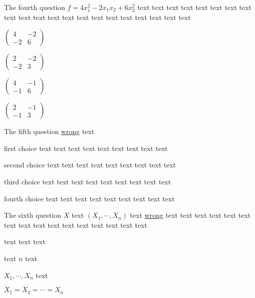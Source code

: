 \documentclass[12pt,most]{randexam}
\begin{document}
\bigskip

\begin{question}
The fourth question $f = 4 x_1^2 - 2 x_1 x_2 + 6 x_2^2$ text text text text text text
text text text text text text text text text text text text text text text 
\begin{abcd}
\item $\left(\begin{array}{cc}
  4 & - 2\\
  - 2 & 6
\end{array}\right)$
\item $\left(\begin{array}{cc}
  2 & - 2\\
  - 2 & 3
\end{array}\right)$
\item $\left(\begin{array}{cc}
  4 & - 1\\
  - 1 & 6
\end{array}\right)$
\item $\left(\begin{array}{cc}
  2 & - 1\\
  - 1 & 3
\end{array}\right)$
\end{abcd}
\end{question}

\bigskip

\begin{question}
The fifth question \underline{wrong} text 
\begin{abcd}
\item first choice text text text text text text text text text
\item second choice text text text text text text text text text
\item third choice text text text text text text text text text
\item fourth choice text text text text text text text text text
\end{abcd}
\end{question}

\bigskip

\begin{question}
The sixth question $X$ text $(X_1,\cdots,X_n)$ text \underline{wrong} text text
text text text text text text text text text text text text text text 
\begin{abcd}
\item text text text
\item text $n$ text
\item $X_1, \cdots, X_n$ text
\item $X_1 = X_2 =\cdots = X_n$
\end{abcd}
\end{question}
\end{document}
